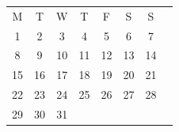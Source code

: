 \documentclass{article}
\begin{document}
\begin{minipage}{0.35\linewidth}
    \rmfamily
\end{minipage}
\hspace{0.05\linewidth}
\begin{minipage}{0.55\linewidth}
    \sffamily
    \large
    \setlength\extrarowheight{5pt}
    \begin{tabular*}{\linewidth}{@{\extracolsep{\fill}} cccccccc}
        M & T & W & T & F & S & S \\
        1 & 2 & 3 & 4 & 5 & 6 & 7 \\
        8 & 9 & 10 & 11 & 12 & 13 & 14 \\
        15 & 16 & 17 & 18 & 19 & 20 & 21 \\
        22 & 23 & 24 & 25 & 26 & 27 & 28 \\
        29 & 30 & 31
    \end{tabular*}
\end{minipage}
\end{document}
